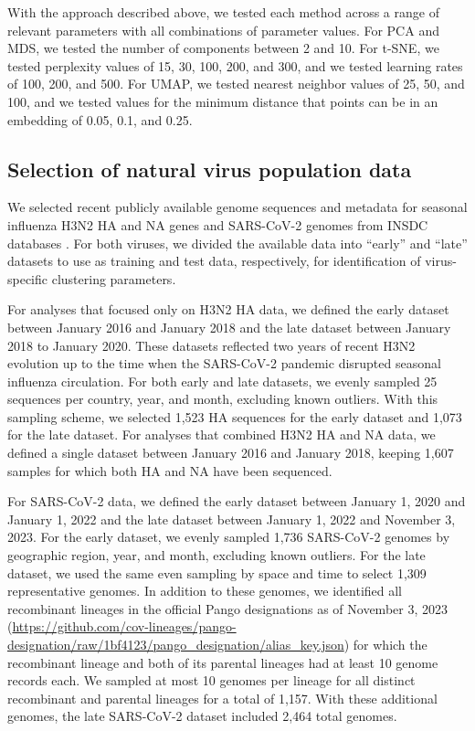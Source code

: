 \documentclass[10pt,letterpaper]{article}
\begin{document}
With the approach described above, we tested each method across a range of relevant parameters with all combinations of parameter values.
For PCA and MDS, we tested the number of components between 2 and 10.
For t-SNE, we tested perplexity values of 15, 30, 100, 200, and 300, and we tested learning rates of 100, 200, and 500.
For UMAP, we tested nearest neighbor values of 25, 50, and 100, and we tested values for the minimum distance that points can be in an embedding of 0.05, 0.1, and 0.25.

\subsection*{Selection of natural virus population data}

We selected recent publicly available genome sequences and metadata for seasonal influenza H3N2 HA and NA genes and SARS-CoV-2 genomes from INSDC databases \cite{Arita2021}.
For both viruses, we divided the available data into ``early'' and ``late'' datasets to use as training and test data, respectively, for identification of virus-specific clustering parameters.

For analyses that focused only on H3N2 HA data, we defined the early dataset between January 2016 and January 2018 and the late dataset between January 2018 to January 2020.
These datasets reflected two years of recent H3N2 evolution up to the time when the SARS-CoV-2 pandemic disrupted seasonal influenza circulation.
For both early and late datasets, we evenly sampled 25 sequences per country, year, and month, excluding known outliers.
With this sampling scheme, we selected 1,523 HA sequences for the early dataset and 1,073 for the late dataset.
For analyses that combined H3N2 HA and NA data, we defined a single dataset between January 2016 and January 2018, keeping 1,607 samples for which both HA and NA have been sequenced.

For SARS-CoV-2 data, we defined the early dataset between January 1, 2020 and January 1, 2022 and the late dataset between January 1, 2022 and November 3, 2023.
For the early dataset, we evenly sampled 1,736 SARS-CoV-2 genomes by geographic region, year, and month, excluding known outliers.
For the late dataset, we used the same even sampling by space and time to select 1,309 representative genomes.
In addition to these genomes, we identified all recombinant lineages in the official Pango designations as of November 3, 2023 (\url{https://github.com/cov-lineages/pango-designation/raw/1bf4123/pango_designation/alias_key.json}) for which the recombinant lineage and both of its parental lineages had at least 10 genome records each.
We sampled at most 10 genomes per lineage for all distinct recombinant and parental lineages for a total of 1,157.
With these additional genomes, the late SARS-CoV-2 dataset included 2,464 total genomes.
\end{document}
